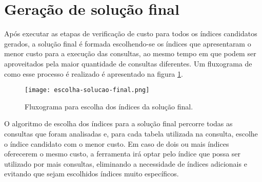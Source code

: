 \section{Geração de solução final}
\label{geracao-solucao-final}

Após executar as etapas de verificação de custo para todos os índices candidatos gerados, a solução final é formada escolhendo-se os índices que apresentaram o menor custo para a execução das consultas, ao mesmo tempo em que podem ser aproveitados pela maior quantidade de consultas diferentes. Um fluxograma de como esse processo é realizado é apresentado na figura \ref{fig:escolha-solucao-final}.


\begin{figure}[!htb]
  \centering
  \caption{Fluxograma para escolha dos índices da solução final.}
  \texttt{[image: escolha-solucao-final.png]}
  \label{fig:escolha-solucao-final}
\end{figure}


O algoritmo de escolha dos índices para a solução final percorre todas as consultas que foram analisadas e, para cada tabela utilizada na consulta, escolhe o índice candidato com o menor custo. Em caso de dois ou mais índices oferecerem o mesmo custo, a ferramenta irá optar pelo índice que possa ser utilizado por mais consultas, eliminando a necessidade de índices adicionais e evitando que sejam escolhidos índices muito específicos.
